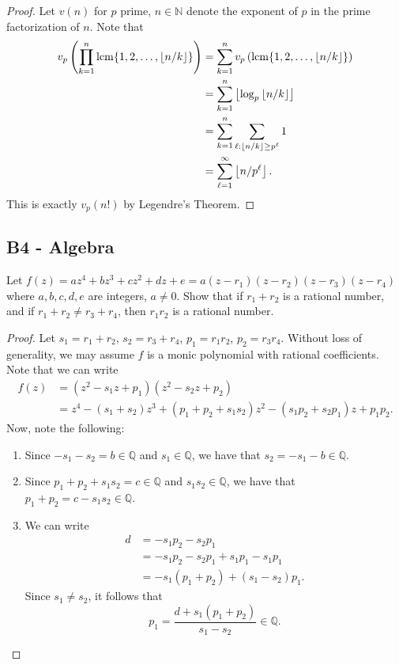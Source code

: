 \documentclass[11pt]{scrartcl}
\newcommand{\N}{\mathbb{N}}
\newcommand{\Q}{\mathbb{Q}}
\newcommand{\<}{\langle}
\renewcommand{\>}{\rangle}
\begin{document}
\begin{proof}
Let $v(n)$ for $p$ prime, $n \in \N$ denote the exponent of $p$ in the prime factorization of $n$.  Note that 
\begin{align*}
v_p\left ( \prod_{k=1}^n \operatorname*{lcm} \{1, 2, \dots, \left\lfloor n/k \right\rfloor\}\right) &= \sum_{k=1}^n v_p \left (\operatorname*{lcm}\{1, 2, \dots, \left\lfloor n/k \right\rfloor\} \right) \\
&= \sum_{k=1}^n \left\lfloor \log_p \left\lfloor n/k \right\rfloor \right\rfloor \\
&= \sum_{k=1}^n \sum_{\ell : \left\lfloor n/k \right\rfloor \ge p^\ell} 1 \\
&= \sum_{\ell=1}^\infty \left\lfloor n/p^\ell \right\rfloor.
\end{align*}
This is exactly $v_p(n!)$ by Legendre's Theorem.  
\end{proof}
\subsection{B4 - Algebra}
Let $f(z) = az^4+ bz^3+ cz^2+ dz + e = a(z -r_1)(z -r_2)(z -r_3)(z -r_4)$ where $a, b, c, d, e$ are integers, $a \not= 0$. Show that if $r_1 + r_2$ is a rational number, and if $r_1 + r_2 \neq r_3 + r_4$, then $r_1r_2$ is a rational number.
\begin{proof}
Let $s_1 = r_1 + r_2$, $s_2 = r_3 + r_4$, $p_1 = r_1r_2$, $p_2 = r_3r_4$.  Without loss of generality, we may assume $f$ is a monic polynomial with rational coefficients.  Note that we can write 
\begin{align*}
f(z) &= (z^2 - s_1z + p_1)(z^2 - s_2 z + p_2) \\
&= z^4 - (s_1 + s_2) z^3 + (p_1 + p_2 + s_1s_2)z^2 - (s_1p_2 + s_2p_1)z + p_1p_2.
\end{align*}
Now, note the following:
\begin{enumerate}
\item Since $-s_1 - s_2 = b \in \Q$ and $s_1 \in \Q$, we have that $s_2 = -s_1 - b \in \Q$.  
\item Since $p_1 + p_2 + s_1s_2 = c \in \Q$ and $s_1s_2 \in \Q$, we have that $p_1 + p_2 = c - s_1s_2 \in \Q$.
\item We can write 
\begin{align*}
d &= -s_1p_2 - s_2p_1 \\
&= -s_1p_2 - s_2p_1 + s_1p_1 - s_1p_1 \\
&= -s_1(p_1 + p_2) + (s_1 - s_2)p_1.
\end{align*}
Since $s_1 \ne s_2$, it follows that 
$$p_1 = \frac{d + s_1(p_1 + p_2)}{s_1 - s_2} \in \Q.$$
\end{enumerate}
\end{proof}
\pagebreak
\end{document}
